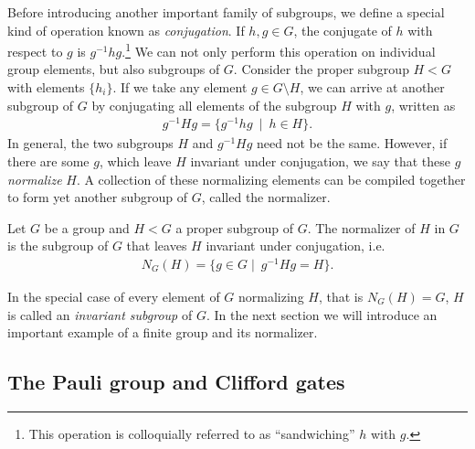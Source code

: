 Before introducing another important family of subgroups, we define a special
kind of operation known as \emph{conjugation}. If $h,g\in G$, the conjugate of
$h$ with respect to $g$ is $g^{-1} h g$.\footnote{This operation is
colloquially referred to as \enquote{sandwiching} $h$ with $g$.}
We can not only perform this operation on individual group elements, but also
subgroups of $G$. 
Consider the proper subgroup $H<G$ with elements $\{h_i\}$. 
If we take any element $g \in G
\setminus H$, we can arrive at another subgroup of $G$ by conjugating all
elements of the
subgroup $H$ with $g$, written as
\begin{align}
  g^{-1}Hg = \{ g^{-1} h g \ \mid \ h \in H \}
.\end{align}
In general, the two subgroups $H$ and $g^{-1}Hg$ need not be the same. However,
if there are some $g$, which leave $H$ invariant under conjugation, we say that
these $g$ \emph{normalize} $H$. A collection of these normalizing elements can
be compiled together to form yet another subgroup of $G$, called the
normalizer.
\begin{defn}[Normalizer]\label{defn:normalizer}
  Let $G$ be a group and $H < G$ a proper subgroup of $G$. The normalizer of
  $H$ in $G$ is the subgroup of $G$ that leaves $H$ invariant under
  conjugation, i.e.
  \begin{align}
    N_G(H) = \{ g \in G \mid \ g^{-1} H g = H \}
  .\end{align}
\end{defn}
In the special case of every element of $G$ normalizing $H$, that is $N_G(H) =
G$, $H$ is called an \emph{invariant subgroup} of $G$. In the next section we
will introduce an important example of a finite group and its normalizer. 
\subsection{The Pauli group and Clifford gates}

